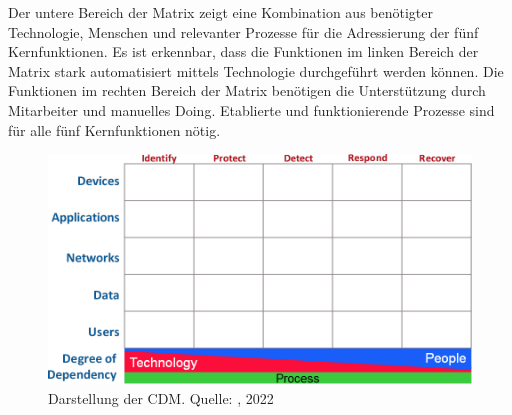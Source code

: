 \bigbreak
Der untere Bereich der Matrix zeigt eine Kombination aus benötigter Technologie, Menschen und relevanter Prozesse für die Adressierung der fünf Kernfunktionen. Es ist erkennbar, dass die Funktionen im linken Bereich der Matrix stark automatisiert mittels Technologie durchgeführt werden können. Die Funktionen im rechten Bereich der Matrix benötigen die Unterstützung durch Mitarbeiter und manuelles Doing. Etablierte und funktionierende Prozesse sind für alle fünf Kernfunktionen nötig.
\bigbreak
\begin{figure}[H]
    \centering
  \includegraphics[width=\linewidth]{images/uploads/a_figure_12.png}
  \caption{Darstellung der CDM. Quelle: \textcite{owasp-CDM}, 2022}
  \label{fig:OWASP-CDM}
\end{figure}

